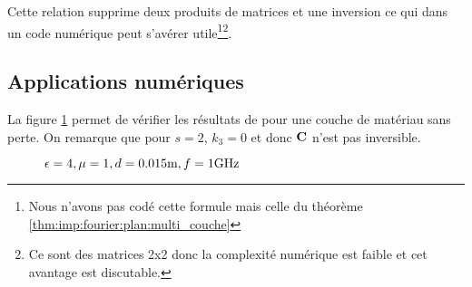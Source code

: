         Cette relation supprime deux produits de matrices et une inversion ce qui dans un code numérique peut s'avérer utile\footnote{Nous n'avons pas codé cette formule mais celle du théorème \ref{thm:imp:fourier:plan:multi_couche}}\footnote{Ce sont des matrices 2x2 donc la complexité numérique est faible et cet avantage est discutable.}.


    \subsection{Applications numériques}

        La figure \ref{fig:imp_fourier:plan:hoppe} permet de vérifier les résultats de \cite[p.~33]{hoppe_impedance_1995} pour une couche de matériau sans perte. On remarque que pour \(s=2\), \(k_3 = 0\) et donc \(\mathbf{C}\) n'est pas inversible.

        \begin{figure}[!hbt]
            \centering
            \caption[Reproduction résultat Hoppe & Rahmat-Samii p.~33]{\(\epsilon = 4, \mu = 1, d=0.015\text{m}, f=1\text{GHz}\)}
            \label{fig:imp_fourier:plan:hoppe}
        \end{figure}

